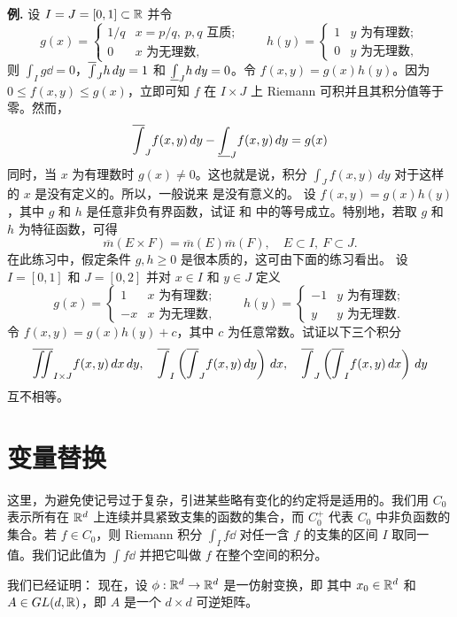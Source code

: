 \textbf{例.} 设 $I=J=[0,1]\subset\mathbb R$ 并令
\[g(x)=\begin{cases}1/q&x=p/q,\ p,q\text{ 互质};\\0&x\text{ 为无理数},\end{cases}\qquad h(y)=\begin{cases}1&y\text{ 为有理数};\\0&y\text{ 为无理数},\end{cases}\]
则 $\int_I g\dd=0$，$\overline{\int}_J h\,dy=1$ 和 $\underline{\int}_J h\,dy=0$。令 $f(x,y)=g(x)h(y)$。因为 $0\le f(x,y)\le g(x)$，立即可知 $f$ 在 $I\times J$ 上 Riemann 可积并且其积分值等于零。然而，
\[\overline{\int}_J f(x,y)\,dy-\underline{\int}_J f(x,y)\,dy=g(x)\]
同时，当 $x$ 为有理数时 $g(x)\ne0$。这也就是说，积分 $\int_J f(x,y)\,dy$ 对于这样的 $x$ 是没有定义的。所以，一般说来  是没有意义的。
\Exercise 设 $f(x,y)=g(x)h(y)$，其中 $g$ 和 $h$ 是任意非负有界函数，试证  和  中的等号成立。特别地，若取 $g$ 和 $h$ 为特征函数，可得
\[\overline m(E\times F)=\overline m(E)\overline m(F),\quad E\subset I,\ F\subset J.\]
在此练习中，假定条件 $g,h\ge0$ 是很本质的，这可由下面的练习看出。
\Exercise 设 $I=[0,1]$ 和 $J=[0,2]$ 并对 $x\in I$ 和 $y\in J$ 定义
\[g(x)=\begin{cases}1&x\text{ 为有理数};\\-x&x\text{ 为无理数},\end{cases}\qquad h(y)=\begin{cases}-1&y\text{ 为有理数};\\y&y\text{ 为无理数}.\end{cases}\]
令 $f(x,y)=g(x)h(y)+c$，其中 $c$ 为任意常数。试证以下三个积分
\[\overline{\iint}_{I\times J}f(x,y)\,dx\,dy,\quad\overline{\int}_I\left(\overline{\int}_J f(x,y)\,dy\right)\,dx,\quad\overline{\int}_J\left(\overline{\int}_I f(x,y)\,dx\right)\,dy\]
互不相等。
\section{变量替换}
这里，为避免使记号过于复杂，引进某些略有变化的约定将是适用的。我们用 $C_0$ 表示所有在 $\mathbb R^d$ 上连续并具紧致支集的函数的集合，而 $C_0^+$ 代表 $C_0$ 中非负函数的集合。若 $f\in C_0$，则 Riemann 积分 $\int_I f\dd$ 对任一含 $f$ 的支集的区间 $I$ 取同一值。我们记此值为 $\int f\dd$ 并把它叫做 $f$ 在整个空间的积分。

我们已经证明：
现在，设 $\phi:\mathbb R^d\to\mathbb R^d$ 是一仿射变换，即
其中 $x_0\in\mathbb R^d$ 和 $A\in GL(d,\mathbb R)$，即 $A$ 是一个 $d\times d$ 可逆矩阵。

